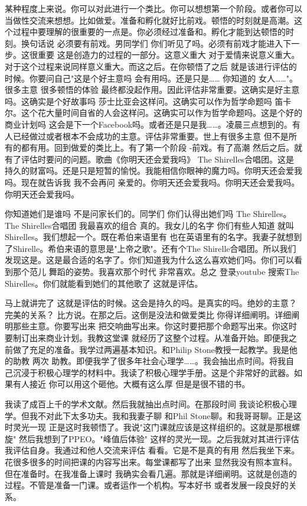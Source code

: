 某种程度上来说。你可以对此进行一个类比。你可以想想第一个阶段。或者你可以当做性交流来想想。比如做爱。准备和孵化就好比前戏。顿悟的时刻就是高潮。这个过程中要理解的很重要的一点是。你必须经过准备和。孵化才能到达顿悟的时刻。换句话说 必须要有前戏。男同学们 你们听见了吗。必须有前戏才能进入下一步。这很重要 这是创造力的过程的一部分。这意义重大 对于爱情来说意义重大。对于这个过程来说同样意义重大。而这之后。在你顿悟了之后 就是该进行评估的时候。你要问自己"这是个好主意吗 会有用吗。还是只是…… 你知道的 女人……"。很多主意 很多顿悟的体验 最终都没起作用。因此评估非常重要。这确实是好主意吗。这确实是个好故事吗 莎士比亚会这样问。这确实可以作为哲学命题吗 笛卡尔。这个花大量时间自省的人会这样问。这确实可以作为哲学命题吗。这是个好的商业计划吗 这会是下一个Facebook吗。或者还是只是我……。凌晨三点想到的。有人已经做过或者根本不会成功的主意。评估非常重要。世上有很多主意 但不是所有的都有用。回到做爱的类比上。有了第一个阶段 -前戏。有了高潮 然后之后。就有了评估时要问的问题。歌曲《你明天还会爱我吗》 The Shirelles合唱团。这是持久的财富吗。还是只是短暂的愉悦。我能相信你眼神的魔力吗。你明天还会爱我吗。现在就告诉我 我不会再问 亲爱的。你明天还会爱我吗。你明天还会爱我吗。你明天还会爱我吗。 

你知道她们是谁吗 不是问家长们的。同学们 你们认得出她们吗 The Shirelles。The Shirelles合唱团 我最喜欢的组合 真的。我女儿的名字 你们有些人知道 就叫Shirelles。我们想起一个。既在希伯来语里有 也在英语里有的名字。我妻子就想到了Shirelle。希伯来语的意思是"上帝之歌"。还有个The Shirelle合唱团。所以我们发现这是。这是最合适的名字了。你们知道我为什么这么喜欢她们吗。你们可以看到那个范儿 舞蹈的姿势。我喜欢那个时代 非常喜欢。总之 登录youtube 搜索The Shirelles。你们就能看到她们的其他歌了 这就是评估。 

马上就讲完了 这就是评估的时候。这会是持久的吗。是真实的吗。绝妙的主意？ 完美的关系？ 比方说。在那之后。这倒是没法和做爱类比 你得详细阐明。详细阐明那些主意。你要写出来 把交响曲写出来。你这时要把那个命题写出来。你这时要制订出来商业计划。我教这堂课 就经历了这整个过程。从准备开始。即便我之前做了充足的准备。我学过两遍基本知识。和Philip Stone教授一起教学。我是他的助教 两次 助教。即便我学了很多年社会心理学……。我会抽出点时间。将我自己沉浸于积极心理学的材料中。我读了积极心理学手册。这是个非常好的武器。如果有人接近 你可以用这个砸他。大概有这么厚 但是是很不错的书。 

我读了成百上千的学术文献。然后我就抽出点时间。在那段时间 我谈论积极心理学。但我不对此下太多功夫。我和我妻子聊 和Phil Stone聊。和我哥哥聊。正是这时灵光一现 正是这时我顿悟了。我说"这门课就应该是这样组织的。这就是那根螺旋" 然后我想到了PPEO。"峰值后体验" 这样的灵光一现。之后我就对其进行评估 我评估自身。我通过和他人交流来评估 看看。它是不是真的有用 然后我坐下来。花很多很多的时间把课的内容写出来。每堂课都写了出来 显然我没有照本宣科。但在准备时。在我准备上课时 我确实会看几遍。那就是详细阐明。这就是创造的过程。不管是准备一门课。或者运作一个机构。写本好书 或者发展一段良好的关系。 

